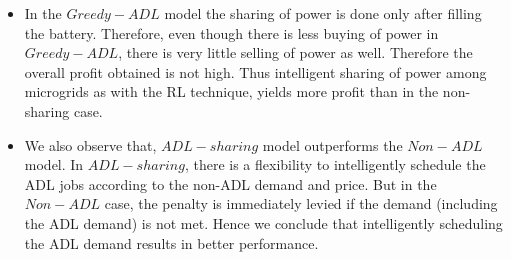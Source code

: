 \begin{itemize}

\item In the $Greedy-ADL$ model the sharing of power is done only after filling the battery. Therefore, even though there is less buying of power in $Greedy-ADL$, there is very little selling of power as well. Therefore the overall profit obtained is not high. Thus intelligent sharing of power among microgrids as with the RL technique, yields more profit than in the non-sharing case. 

\item We also observe that, $ADL-sharing$ model outperforms the $Non-ADL$ model. In $ADL-sharing$, there is a flexibility to intelligently schedule the ADL jobs according to the non-ADL demand and price. But in the $Non-ADL$ case, the penalty is immediately levied if the demand (including the ADL demand) is not met. Hence we conclude that intelligently scheduling the ADL demand results in better performance.



	

\end{itemize}
